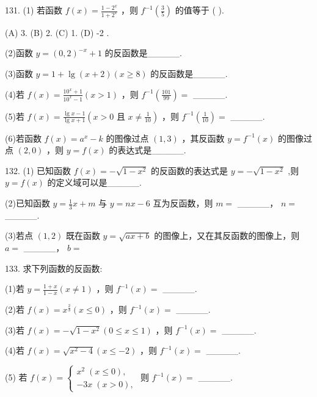 \documentclass[10pt]{article}
\begin{document}
131. (1) 若函数 \(f\left( x\right)  = \frac{1 - {2}^{x}}{1 + {2}^{x}}\) ，则 \({f}^{-1}\left( \frac{3}{5}\right)\) 的值等于 ( ).

(A) 3. (B) 2. (C) 1. (D) -2 .

(2)函数 \(y = {\left( 0,2\right) }^{-x} + 1\) 的反函数是\_\_\_\_\_.

(3)函数 \(y = 1 + \lg \left( {x + 2}\right) \left( {x \geq  8}\right)\) 的反函数是\_\_\_\_\_.

(4)若 \(f\left( x\right)  = \frac{{10}^{x} + 1}{{10}^{x} - 1}\left( {x > 1}\right)\) ，则 \({f}^{-1}\left( \frac{101}{99}\right)  =\) \_\_\_\_\_.

(5)若 \(f\left( x\right)  = \frac{\lg x - 1}{\lg x + 1}\left( {x > 0\text{ 且 }x \neq  \frac{1}{10}}\right)\) ，则 \({f}^{-1}\left( \frac{1}{10}\right)  =\) \_\_\_\_\_.

(6)若函数 \(f\left( x\right)  = {a}^{x} - k\) 的图像过点 \(\left( {1,3}\right)\) ，其反函数 \(y = {f}^{-1}\left( x\right)\) 的图像过点 \(\left( {2,0}\right)\) ，则 \(y = f\left( x\right)\) 的表达式是\_\_\_\_\_.

132. (1) 已知函数 \(f\left( x\right)  =  - \sqrt{1 - {x}^{2}}\) 的反函数的表达式是 \(y =  - \sqrt{1 - {x}^{2}}\) ,则 \(y = f\left( x\right)\) 的定义域可以是\_\_\_\_\_.

(2)已知函数 \(y = \frac{1}{3}x + m\) 与 \(y = {nx} - 6\) 互为反函数，则 \(m =\) \_\_\_\_\_， \(n =\) \_\_\_\_\_.

(3)若点 \(\left( {1,2}\right)\) 既在函数 \(y = \sqrt{{ax} + b}\) 的图像上，又在其反函数的图像上，则 \(a =\) \_\_\_\_\_， \(b =\)

133. 求下列函数的反函数:

(1)若 \(y = \frac{1 + x}{1 - x}\left( {x \neq  1}\right)\) ，则 \({f}^{-1}\left( x\right)  =\) \_\_\_\_\_.

(2)若 \(f\left( x\right)  = {x}^{\frac{2}{3}}\left( {x \leq  0}\right)\) ，则 \({f}^{-1}\left( x\right)  =\) \_\_\_\_\_.

(3)若 \(f\left( x\right)  =  - \sqrt{1 - {x}^{2}}\left( {0 \leq  x \leq  1}\right)\) ，则 \({f}^{-1}\left( x\right)  =\) \_\_\_\_\_.

(4)若 \(f\left( x\right)  = \sqrt{{x}^{2} - 4}\left( {x \leq   - 2}\right)\) ，则 \({f}^{-1}\left( x\right)  =\) \_\_\_\_\_.

(5) 若 \(f\left( x\right)  = \left\{  \begin{array}{l} {x}^{2}\;\left( {x \leq  0}\right) , \\   - {3x}\;\left( {x > 0}\right) , \end{array}\right.\) 则 \({f}^{-1}\left( x\right)  =\) \_\_\_\_\_.
\end{document}
